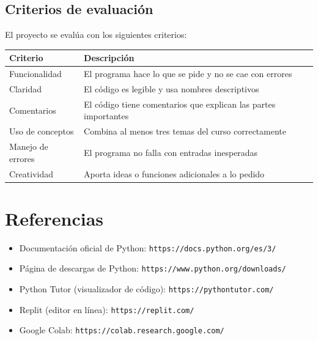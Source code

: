 \documentclass[11pt,a4paper]{article}
\begin{document}
\subsection{Criterios de evaluación}

El proyecto se evalúa con los siguientes criterios:

\begin{table}[h]
\centering
\begin{tabularx}{\textwidth}{l X}
\toprule
\textbf{Criterio} & \textbf{Descripción} \\
\midrule
Funcionalidad & El programa hace lo que se pide y no se cae con errores \\
Claridad & El código es legible y usa nombres descriptivos \\
Comentarios & El código tiene comentarios que explican las partes importantes \\
Uso de conceptos & Combina al menos tres temas del curso correctamente \\
Manejo de errores & El programa no falla con entradas inesperadas \\
Creatividad & Aporta ideas o funciones adicionales a lo pedido \\
\bottomrule
\end{tabularx}
\end{table}

\section{Referencias}

\begin{itemize}
    \item Documentación oficial de Python: \texttt{https://docs.python.org/es/3/}
    \item Página de descargas de Python: \texttt{https://www.python.org/downloads/}
    \item Python Tutor (visualizador de código): \texttt{https://pythontutor.com/}
    \item Replit (editor en línea): \texttt{https://replit.com/}
    \item Google Colab: \texttt{https://colab.research.google.com/}
\end{itemize}
\end{document}
